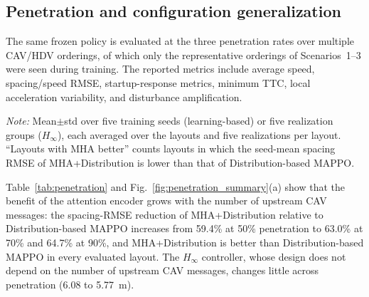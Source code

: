 \documentclass{ieeeaccess}
\begin{document}
\subsection{Penetration and configuration generalization}
\label{sec:penetration_generalization}

The same frozen policy is evaluated at the three penetration rates over multiple CAV/HDV orderings, of which only the representative orderings of Scenarios~1--3 were seen during training. The reported metrics include average speed, spacing/speed RMSE, startup-response metrics, minimum TTC, local acceleration variability, and disturbance amplification.

\begin{table}[htbp]
\centering
\caption{Spacing RMSE (m) Across CAV Penetration Rates (30\% Bernoulli Loss, Averaged over Layouts)}
\label{tab:penetration}
\setlength{\tabcolsep}{4pt}
\renewcommand{\arraystretch}{1.2}

\vspace{0.2cm}
{\raggedright
\footnotesize
\textit{Note:} Mean$\pm$std over five training seeds (learning-based) or five realization groups ($H_\infty$), each averaged over the layouts and five realizations per layout. ``Layouts with MHA better'' counts layouts in which the seed-mean spacing RMSE of MHA+Distribution is lower than that of Distribution-based MAPPO.
\par}
\end{table}

Table~\ref{tab:penetration} and Fig.~\ref{fig:penetration_summary}(a) show that the benefit of the attention encoder grows with the number of upstream CAV messages: the spacing-RMSE reduction of MHA+Distribution relative to Distribution-based MAPPO increases from 59.4\% at 50\% penetration to 63.0\% at 70\% and 64.7\% at 90\%, and MHA+Distribution is better than Distribution-based MAPPO in every evaluated layout. The $H_\infty$ controller, whose design does not depend on the number of upstream CAV messages, changes little across penetration (6.08 to 5.77~m). %
\end{document}
